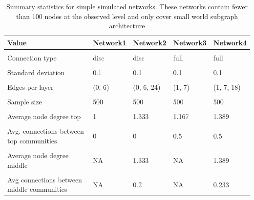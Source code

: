 \documentclass[
]{article}
\begin{document}
\begin{table}
\centering\centering
\caption{\label{tab:unnamed-chunk-5}Summary statistics for simple simulated networks. These networks contain fewer than 100 nodes at the observed level and only cover small world subgraph architecture}
\centering
\fontsize{10}{12}\selectfont
\fontsize{10}{12}\selectfont
\begin{tabular}[t]{>{\raggedright\arraybackslash}p{8em}llll}
\toprule
Value & Network1 & Network2 & Network3 & Network4\\
\midrule
\cellcolor{gray!10}{Subgraph type} & \cellcolor{gray!10}{small world} & \cellcolor{gray!10}{small world} & \cellcolor{gray!10}{small world} & \cellcolor{gray!10}{small world}\\
Connection type & disc & disc & full & full\\
\cellcolor{gray!10}{Layers} & \cellcolor{gray!10}{2} & \cellcolor{gray!10}{3} & \cellcolor{gray!10}{2} & \cellcolor{gray!10}{3}\\
Standard deviation & 0.1 & 0.1 & 0.1 & 0.1\\
\cellcolor{gray!10}{Nodes per layer} & \cellcolor{gray!10}{(2, 6)} & \cellcolor{gray!10}{(2, 6, 18)} & \cellcolor{gray!10}{(2, 6)} & \cellcolor{gray!10}{(2, 6, 18)}\\
\addlinespace
Edges per layer & (0, 6) & (0, 6, 24) & (1, 7) & (1, 7, 18)\\
\cellcolor{gray!10}{Subgraph probability} & \cellcolor{gray!10}{0.05} & \cellcolor{gray!10}{0.05} & \cellcolor{gray!10}{0.05} & \cellcolor{gray!10}{0.05}\\
Sample size & 500 & 500 & 500 & 500\\
\cellcolor{gray!10}{Modularity (top)} & \cellcolor{gray!10}{0.5} & \cellcolor{gray!10}{0.5} & \cellcolor{gray!10}{0.357} & \cellcolor{gray!10}{0.46}\\
Average node degree top & 1 & 1.333 & 1.167 & 1.389\\
\addlinespace
\cellcolor{gray!10}{Avg connections within top communities} & \cellcolor{gray!10}{3} & \cellcolor{gray!10}{12} & \cellcolor{gray!10}{3} & \cellcolor{gray!10}{12}\\
Avg. connections between top communities & 0 & 0 & 0.5 & 0.5\\
\cellcolor{gray!10}{Modularity (middle)} & \cellcolor{gray!10}{NA} & \cellcolor{gray!10}{0.583} & \cellcolor{gray!10}{NA} & \cellcolor{gray!10}{0.553}\\
Average node degree middle & NA & 1.333 & NA & 1.389\\
\cellcolor{gray!10}{Avg connections within middle communities} & \cellcolor{gray!10}{NA} & \cellcolor{gray!10}{3} & \cellcolor{gray!10}{NA} & \cellcolor{gray!10}{3}\\
\addlinespace
Avg connections between middle communities & NA & 0.2 & NA & 0.233\\
\bottomrule
\end{tabular}
\end{table}
\end{document}
